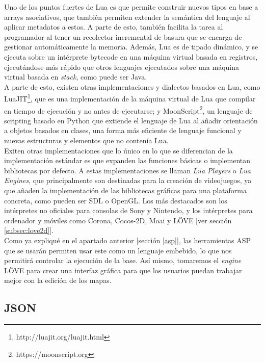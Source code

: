 Uno de los puntos fuertes de Lua es que permite construir nuevos tipos en base a arrays asociativos, que también permiten extender la semántica del lenguaje al aplicar metadatos a estos. A parte de esto, también facilita la tarea al programador al tener un recolector incremental de basura que se encarga de gestionar automáticamente la memoria. Además, Lua es de tipado dinámico, y se ejecuta sobre un intérprete bytecode en una máquina virtual basada en registros, ejecutándose más rápido que otros lenguajes ejecutados sobre una máquina virtual basada en \textit{stack}, como puede ser Java. \\

A parte de esto, existen otras implementaciones y dialectos basados en Lua, como LuaJIT\footnote{http://luajit.org/luajit.html}, que es una implementación de la máquina virtual de Lua que compilar en tiempo de ejecución y no antes de ejecutarse; y MoonScript\footnote{https://moonscript.org}, un lenguaje de scripting basado en Python que extiende el lenguaje de Lua al añadir orientación a objetos basados en clases, una forma más eficiente de lenguaje funcional y nuevas estructuras y elementos que no contenía Lua. \\

Exiten otras implementaciones que lo único en lo que se diferencian de la implementación estándar es que expanden las funciones básicas o implementan bibliotecas por defecto. A estas implementaciones se llaman \textit{Lua Players} o \textit{Lua Engines}, que principalmente son destinadas para la creación de videojuegos, ya que añaden la implementación de las bibliotecas gráficas para una plataforma concreta, como pueden ser SDL o OpenGL. Los más destacados son los intérpretes no oficiales para consolas de Sony y Nintendo, y los intérpretes para ordenador y móviles como Corona, Cocos-2D, Moai y LÖVE [ver sección \ref{subsec:love2d}]. \\

Como ya expliqué en el apartado anterior [sección \ref{asp}], las herramientas ASP que se usarán permiten usar este como un lenguaje embebido, lo que nos permitirá controlar la ejecución de la base. Así mismo, tomaremos el \textit{engine} LÖVE para crear una interfaz gráfica para que los usuarios puedan trabajar mejor con la edición de los mapas.

\subsection{JSON}


